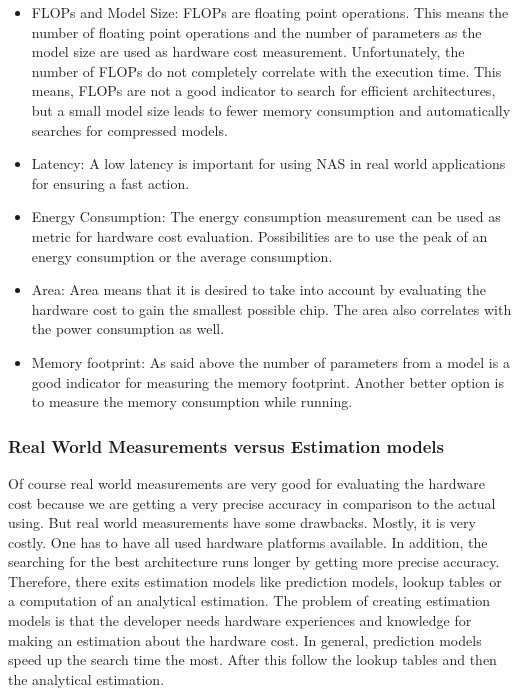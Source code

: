 \documentclass[conference]{IEEEtran}
\begin{document}
\begin{itemize}
\item FLOPs and Model Size: FLOPs are floating point operations. This means the number of floating point operations and the number of parameters as the model size are used as hardware cost measurement. Unfortunately, the number of FLOPs do not completely correlate with the execution time. This means, FLOPs are not a good indicator to search for efficient architectures, but a small model size leads to fewer memory consumption and automatically searches for compressed models. 
\item Latency: A low latency is important for using NAS in real world applications for ensuring a fast action. 
\item Energy Consumption: The energy consumption measurement can be used as metric for hardware cost evaluation. Possibilities are to use the peak of an energy consumption or the average consumption.
\item Area: Area means that it is desired to take into account by evaluating the hardware cost to gain the smallest possible chip. The area also correlates with the power consumption as well.
\item Memory footprint: As said above the number of parameters from a model is a good indicator for measuring the memory footprint. Another better option is to measure the memory consumption while running.     
\end{itemize}

\subsubsection{Real World Measurements versus Estimation models}

Of course real world measurements are very good for evaluating the hardware cost because we are getting a very precise accuracy in comparison to the actual using. But real world measurements have some drawbacks. Mostly, it is very costly. One has to have all used hardware platforms available. In addition, the searching for the best architecture runs longer by getting more precise accuracy. Therefore, there exits estimation models like prediction models, lookup tables or a computation of an analytical estimation. The problem of creating estimation models is that the developer needs hardware experiences and knowledge for making an estimation about the hardware cost. In general, prediction models speed up the search time the most. After this follow the lookup tables and then the analytical estimation. 
\end{document}

